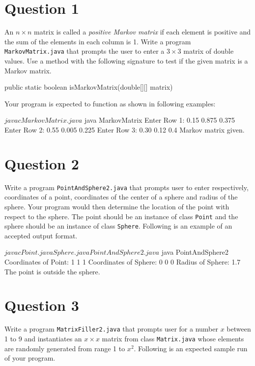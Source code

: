 \section*{Question 1}

An $n \times n$ matrix is called a \textit{positive Markov matrix} if each element is positive and the sum of the elements in each column is 1.
Write a program \texttt{MarkovMatrix.java} that prompts the user to enter a $3 \times 3$ matrix of double values.
Use a method with the following signature to test if the given matrix is a Markov matrix.

\begin{terminal}
public static boolean isMarkovMatrix(double[][] matrix)
\end{terminal}

Your program is expected to function as shown in following examples:

\begin{terminal}
$ javac MarkovMatrix.java
$ java MarkovMatrix
Enter Row 1: 0.15 0.875 0.375
Enter Row 2: 0.55 0.005 0.225
Enter Row 3: 0.30 0.12 0.4
Markov matrix given.
\end{terminal}

\section*{Question 2}
Write a program \texttt{PointAndSphere2.java} that prompts user to enter respectively, coordinates of a point, coordinates of the center of a sphere and radius of the sphere.
Your program would then determine the location of the point with respect to the sphere.
The point should be an instance of class \texttt{Point} and the sphere should be an instance of class \texttt{Sphere}.
Following is an example of an accepted output format.

\vfill
\newpage

\begin{terminal}
$ javac Point.java Sphere.java PointAndSphere2.java
$ java PointAndSphere2
Coordinates of Point: 1 1 1
Coordinates of Sphere: 0 0 0
Radius of Sphere: 1.7
The point is outside the sphere.
\end{terminal}

\section*{Question 3}
Write a program \texttt{MatrixFiller2.java} that prompts user for a number $x$ between 1 to 9 and instantiates an $x \times x$ matrix from class \texttt{Matrix.java} whose elements are randomly generated from range 1 to $x^2$.
Following is an expected sample run of your program.

